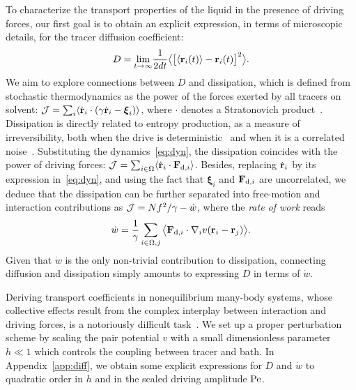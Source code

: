 \documentclass[superscriptaddress, twocolumn, prx, longbibliography, nofootinbib]{revtex4-1}
\begin{document}
To characterize the transport properties of the liquid in the presence of driving forces, our first goal is to obtain an explicit expression, in terms of microscopic details, for the tracer diffusion coefficient:
\begin{equation}
	D = \underset{t\to\infty}{\lim} \frac{1}{2dt} \big\langle \big[\langle{\bf r}_i(t)\rangle-{\bf r}_i(t)\big]^2 \big\rangle .
\end{equation}
We aim to explore connections between $D$ and dissipation, which is defined from stochastic thermodynamics as the power of the forces exerted by all tracers on solvent: ${\cal J} = \sum_i\langle\dot{\bf r}_i\cdot(\gamma\dot{\bf r}_i-{\boldsymbol\xi}_i)\rangle$, where $\cdot$ denotes a Stratonovich product~\cite{Sekimoto1998, Seifert2012}. Dissipation is directly related to entropy production, as a measure of irreversibility, both when the drive is deterministic~\cite{Sekimoto1998, Seifert2012} and when it is a correlated noise~\cite{Mandal2017, Seifert2018, Shankar2018, Bo2019}. Substituting the dynamics~\eqref{eq:dyn}, the dissipation coincides with the power of driving forces: ${\cal J} = \sum_{i\in\Omega}\langle\dot{\bf r}_i\cdot{\bf F}_{{\rm d},i}\rangle$. Besides, replacing $\dot{\bf r}_i$ by its expression in~\eqref{eq:dyn}, and using the fact that ${\boldsymbol\xi}_i$ and ${\bf F}_{{\rm d},i}$ are uncorrelated, we deduce that the dissipation can be further separated into free-motion and interaction contributions as ${\cal J} = N f^2/\gamma - \dot w$, where the {\it rate of work} reads
\begin{equation}\label{eq:work}
	\dot w = \frac{1}{\gamma} \sum_{i\in\Omega,j}\big\langle {\bf F}_{{\rm d},i}\cdot\nabla_iv({\bf r}_i-{\bf r}_j)\big\rangle.
\end{equation}
Given that $\dot w$ is the only non-trivial contribution to dissipation, connecting diffusion and dissipation simply amounts to expressing $D$ in terms of $\dot w$.


Deriving transport coefficients in nonequilibrium many-body systems, whose collective effects result from the complex interplay between interaction and driving forces, is a notoriously difficult task~\cite{Voituriez2016, Brady2017, Stenhammar2017, Tailleur2017, Illien2018}. We set up a proper perturbation scheme by scaling the pair potential $v$ with a small dimensionless parameter $h\ll1$ which controls the coupling between tracer and bath. In Appendix~\ref{app:diff}, we obtain some explicit expressions for $D$ and $\dot w$ to quadratic order in $h$ and in the scaled driving amplitude $\rm Pe$.
\end{document}
